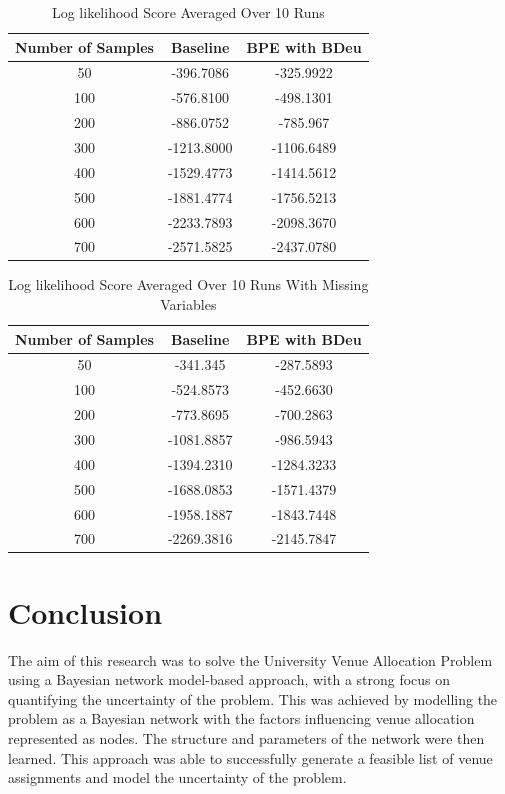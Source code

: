 \documentclass[conference]{IEEEtran}
\begin{document}
\begin{table}[htbp]
\caption{Log likelihood Score Averaged Over 10 Runs}
\begin{center}
\begin{tabular}{|c|c|c|}
\hline
\textbf{Number of Samples} & \textbf{Baseline} & \textbf{BPE with BDeu} \\
\hline
50& -396.7086 & -325.9922 \\
100 & -576.8100 & -498.1301 \\
200 & -886.0752 & -785.967 \\
300 & -1213.8000 & -1106.6489\\
400 & -1529.4773 &  -1414.5612\\
500 &  -1881.4774 & -1756.5213\\
600 & -2233.7893 & -2098.3670\\
700 & -2571.5825 & -2437.0780\\
\hline
\end{tabular}
\label{tab1}
\end{center}
\end{table}

\begin{table}[htbp]
\caption{Log likelihood Score Averaged Over 10 Runs With Missing Variables}
\begin{center}
\begin{tabular}{|c|c|c|}
\hline
\textbf{Number of Samples} & \textbf{Baseline} & \textbf{BPE with BDeu} \\
\hline
50& -341.345 & -287.5893 \\
100 & -524.8573 & -452.6630 \\
200 & -773.8695 & -700.2863 \\
300 & -1081.8857 & -986.5943\\
400 & -1394.2310 &  -1284.3233\\
500 &  -1688.0853 & -1571.4379\\
600 & -1958.1887 & -1843.7448\\
700 & -2269.3816 & -2145.7847\\
\hline
\end{tabular}
\label{tab2}
\end{center}
\end{table}

\section{Conclusion}
The aim of this research was to solve the University Venue Allocation Problem using a Bayesian network model-based approach, with a strong focus on quantifying the uncertainty of the problem. This was achieved by modelling the problem as a Bayesian network with the factors influencing venue allocation represented as nodes. The structure and parameters of the network were then learned. This approach was able to successfully generate a feasible list of venue assignments and model the uncertainty of the problem.
\end{document}
